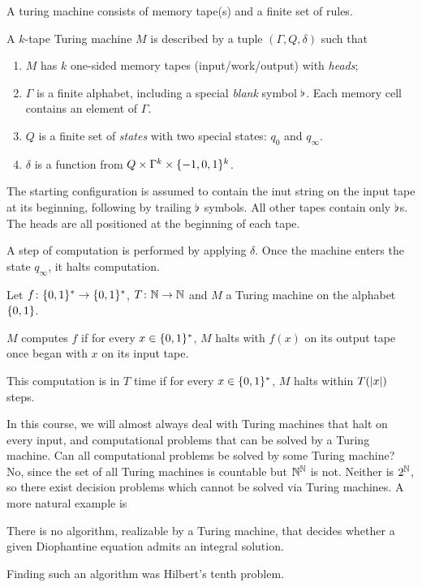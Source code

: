 A turing machine consists of memory tape(s) and a finite set of rules.
\begin{definition}
    A $k$-tape Turing machine $M$ is described by a tuple
    $(\Gamma, Q, \delta)$ such that
    \begin{enumerate}
        \item $M$ has $k$ one-sided memory tapes (input/work/output)
            with \emph{heads};
        \item $\Gamma$ is a finite alphabet, including a special
            \emph{blank} symbol $\flat$.
            Each memory cell contains an element of $\Gamma$.
        \item $Q$ is a finite set of \emph{states} with two special states:
            $q_0$ and $q_\infty$.
        \item $\delta$ is a function from
            $Q \times \Gamma^k \times \{-1, 0, 1\}^k$.
    \end{enumerate}
    The starting configuration is assumed to contain the inut string on the
    input tape at its beginning, following by trailing $\flat$ symbols.
    All other tapes contain only $\flat$s.
    The heads are all positioned at the beginning of each tape.

    A step of computation is performed by applying $\delta$.
    Once the machine enters the state $q_\infty$, it halts computation.
\end{definition}

Let $f\colon \{0, 1\}^* \to \{0, 1\}^*$, $T\colon \mathbb{N} \to \mathbb{N}$ and
$M$ a Turing machine on the alphabet $\{0, 1\}$.
\begin{definition} \label{def:runtime}
    $M$ computes $f$ if for every $x \in \{0, 1\}^*$,
    $M$ halts with $f(x)$ on its output tape once began with $x$ on its
    input tape.

    This computation is in $T$ time if for every $x \in \{0, 1\}^*$,
    $M$ halts within $T(\lvert x\rvert)$ steps.
\end{definition}

In this course, we will almost always deal with Turing machines that halt on
every input, and computational problems that can be solved by a Turing
machine.
Can all computational problems be solved by some Turing machine?
No, since the set of all Turing machines is countable but $\mathbb{N}^{\mathbb{N}}$ is not.
Neither is $2^{\mathbb{N}}$, so there exist decision problems which cannot be solved
via Turing machines.
A more natural example is
\begin{fact*}[DPRM70]
    There is no algorithm, realizable by a Turing machine, that decides
    whether a given Diophantine equation admits an integral solution.
\end{fact*}
Finding such an algorithm was Hilbert's tenth problem.

